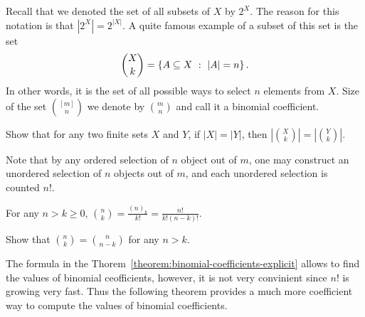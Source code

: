 Recall that we denoted the set of all subsets of $X$ by $2^X$. The reason for
this notation is that $|2^X| = 2^{|X|}$. A quite famous example of a subset of
this set is the set
\[
  \binom{X}{k} = \set[|A| = n]{A \subseteq X}.
\]
In other words, it is the set of all possible ways to select $n$ elements from
$X$. Size of the set $\binom{[m]}{n}$ we denote by $\binom{m}{n}$ and call it a
binomial coefficient.
\begin{exercise}
  Show that for any two finite sets $X$ and $Y$, if $|X| = |Y|$, then
  $\left|\binom{X}{k}\right| = \left|\binom{Y}{k}\right|$.
\end{exercise}

Note that by any ordered selection of $n$ object out of $m$, one may construct
an unordered selection of $n$ objects out of $m$, and each unordered selection
is counted $n!$.
\begin{theorem}
\label{theorem:binomial-coefficients-explicit}
  For any $n > k \ge 0$,
  $\binom{n}{k} = \frac{(n)_k}{k!} = \frac{n!}{k!  (n - k)!}$.
\end{theorem}

\begin{exercise}
  Show that $\binom{n}{k} = \binom{n}{n - k}$ for any $n > k$.
\end{exercise}

The formula in the Thorem~\ref{theorem:binomial-coefficients-explicit} allows
to find the values of binomial ceofficients, however, it is not very convinient
since $n!$ is growing very fast. Thus the following theorem provides a much more
coefficient way to compute the values of binomial coefficients.

